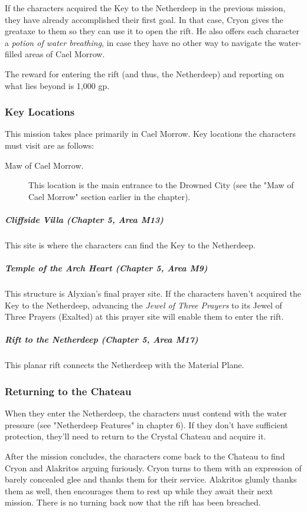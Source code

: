 \documentclass[10pt,a4paper,twoside,fancy,bg=print,twocolumn,openany,nodeprecatedcode]{dndbook}
\begin{document}
If the characters acquired the Key to the Netherdeep in the previous mission, they have already accomplished their first goal. In that case, Cryon gives the greataxe to them so they can use it to open the rift. He also offers each character a \textit{potion of water breathing}, in case they have no other way to navigate the water-filled areas of Cael Morrow.

The reward for entering the rift (and thus, the Netherdeep) and reporting on what lies beyond is 1,000 gp.

\subsubsection{Key Locations}
This mission takes place primarily in Cael Morrow. Key locations the characters must visit are as follows:


\begin{description}
\item[Maw of Cael Morrow.]
This location is the main entrance to the Drowned City (see the "Maw of Cael Morrow" section earlier in the chapter).
\end{description}

\subparagraph{Cliffside Villa (Chapter 5, Area M13)}
This site is where the characters can find the Key to the Netherdeep.

\subparagraph{Temple of the Arch Heart (Chapter 5, Area M9)}
This structure is Alyxian's final prayer site. If the characters haven't acquired the Key to the Netherdeep, advancing the \textit{Jewel of Three Prayers} to its Jewel of Three Prayers (Exalted) at this prayer site will enable them to enter the rift.

\subparagraph{Rift to the Netherdeep (Chapter 5, Area M17)}
This planar rift connects the Netherdeep with the Material Plane.

\subsubsection{Returning to the Chateau}
When they enter the Netherdeep, the characters must contend with the water pressure (see "Netherdeep Features" in chapter 6). If they don't have sufficient protection, they'll need to return to the Crystal Chateau and acquire it.

After the mission concludes, the characters come back to the Chateau to find Cryon and Alakritos arguing furiously. Cryon turns to them with an expression of barely concealed glee and thanks them for their service. Alakritos glumly thanks them as well, then encourages them to rest up while they await their next mission. There is no turning back now that the rift has been breached.
\end{document}
